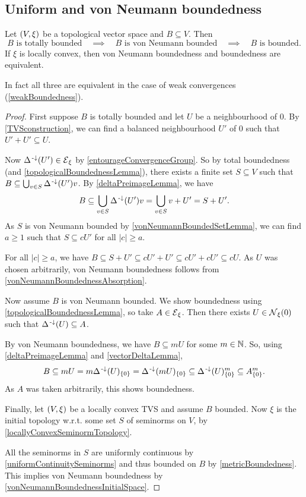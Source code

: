\subsection{Uniform and von Neumann boundedness}
\begin{proposition} \label{boundednessTVS}
Let $\sSet{V,\xi}$ be a topological vector space and $B\subseteq V$. Then
\[ \text{$B$ is totally bounded}\quad\implies\quad\text{$B$ is von Neumann bounded}\quad\implies\quad\text{$B$ is bounded}. \]
If $\xi$ is locally convex, then von Neumann boundedness and boundedness are equivalent.
\end{proposition}
In fact all three are equivalent in the case of weak convergences (\ref{weakBoundedness}).
\begin{proof}
First suppose $B$ is totally bounded and let $U$ be a neighbourhood of $0$. By \ref{TVSconstruction}, we can find a balanced neighbourhood $U'$ of $0$ such that $U'+U'\subseteq U$.

Now $\Delta^{\text{\hspace{0.15em}-}\downarrow}(U')\in \operatorname{\mathcal{E}}_\xi$ by \ref{entourageConvergenceGroup}. So by total boundedness (and \ref{topologicalBoundednessLemma}), there exists a finite set $S\subseteq V$ such that $B\subseteq \bigcup_{v\in S}\Delta^{\text{\hspace{0.15em}-}\downarrow}(U')v$. By \ref{deltaPreimageLemma}, we have
\[ B\subseteq \bigcup_{v\in S}\Delta^{\text{\hspace{0.15em}-}\downarrow}(U')v = \bigcup_{v\in S} v+U' = S+U'. \]
As $S$ is von Neumann bounded by \ref{vonNeumannBoundedSetLemma}, we can find $a\geq 1$ such that $S\subseteq cU'$ for all $|c|\geq a$.

For all $|c|\geq a$, we have $B\subseteq S+U' \subseteq cU' + U' \subseteq cU'+cU' \subseteq cU$. As $U$ was chosen arbitrarily, von Neumann boundedness follows from \ref{vonNeumannBoundednessAbsorption}.

Now assume $B$ is von Neumann bounded. We show boundedness using \ref{topologicalBoundednessLemma}, so take $A\in \operatorname{\mathcal{E}}_\xi$. Then there exists $U\in \operatorname{\mathcal{N}}_\xi(0)$ such that $\Delta^{\text{\hspace{0.15em}-}\downarrow}(U)\subseteq A$.

By von Neumann boundedness, we have $B\subseteq mU$ for some $m\in\mathbb{N}$. So, using \ref{deltaPreimageLemma} and \ref{vectorDeltaLemma},
\[ B\subseteq mU = m\Delta^{\text{\hspace{0.15em}-}\downarrow}(U)_{\{0\}} = \Delta^{\text{\hspace{0.15em}-}\downarrow}(mU)_{\{0\}} \subseteq \Delta^{\text{\hspace{0.15em}-}\downarrow}(U)^m_{\{0\}} \subseteq A^m_{\{0\}}. \]
As $A$ was taken arbitrarily, this shows boundedness.

Finally, let $\sSet{V,\xi}$ be a locally convex TVS and assume $B$ bounded. Now $\xi$ is the initial topology w.r.t. some set $S$ of seminorms on $V$, by \ref{locallyConvexSeminormTopology}.

All the seminorms in $S$ are uniformly continuous by \ref{uniformContinuitySeminorms} and thus bounded on $B$ by \ref{metricBoundedness}. This implies von Neumann boundedness by \ref{vonNeumannBoundednessInitialSpace}.
\end{proof}


